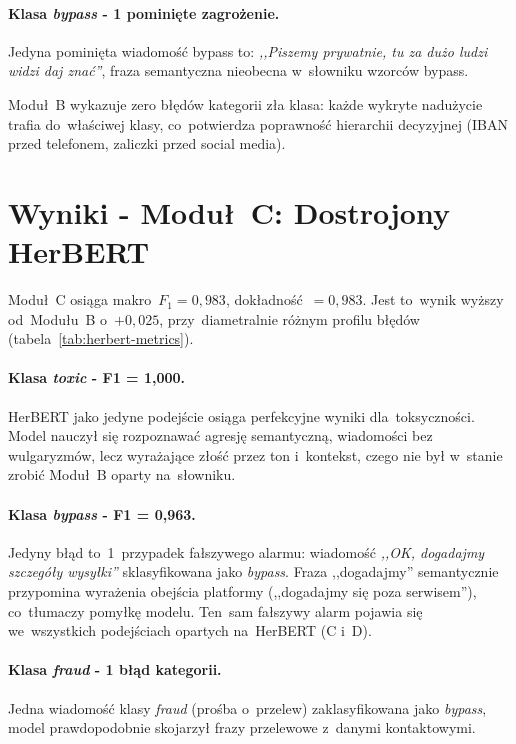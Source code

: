 \paragraph{Klasa \textit{bypass} - 1 pominięte zagrożenie.}
Jedyna pominięta wiadomość bypass to:
\textit{,,Piszemy prywatnie, tu za dużo ludzi widzi daj znać''},
fraza semantyczna nieobecna w~słowniku wzorców bypass.

Moduł~B wykazuje zero błędów kategorii zła klasa: każde wykryte
nadużycie trafia do~właściwej klasy, co~potwierdza poprawność hierarchii
decyzyjnej (IBAN przed telefonem, zaliczki przed social media).

\section{Wyniki - Moduł~C: Dostrojony HerBERT}
\label{sec:wyniki-herbert}



Moduł~C osiąga makro~$F_1 = 0{,}983$, dokładność~$= 0{,}983$.
Jest to~wynik wyższy od~Modułu~B o~$+0{,}025$, przy~diametralnie
różnym profilu błędów (tabela~\ref{tab:herbert-metrics}).

\paragraph{Klasa \textit{toxic} - F1 = 1{,}000.}
HerBERT jako jedyne podejście osiąga perfekcyjne wyniki dla~toksyczności.
Model nauczył się rozpoznawać agresję semantyczną, wiadomości bez wulgaryzmów,
lecz wyrażające złość przez ton i~kontekst, czego nie był w~stanie zrobić
Moduł~B oparty na~słowniku.

\paragraph{Klasa \textit{bypass} - F1 = 0{,}963.}
Jedyny błąd to~1~przypadek fałszywego alarmu: wiadomość \textit{,,OK, dogadajmy szczegóły
wysyłki''} sklasyfikowana jako \textit{bypass}. Fraza ,,dogadajmy'' semantycznie
przypomina wyrażenia obejścia platformy (,,dogadajmy się poza serwisem''),
co~tłumaczy pomyłkę modelu. Ten~sam fałszywy alarm pojawia się we~wszystkich podejściach
opartych na~HerBERT (C i~D).

\paragraph{Klasa \textit{fraud} - 1 błąd kategorii.}
Jedna wiadomość klasy \textit{fraud} (prośba o~przelew) zaklasyfikowana
jako \textit{bypass}, model prawdopodobnie skojarzył frazy przelewowe
z~danymi kontaktowymi.

